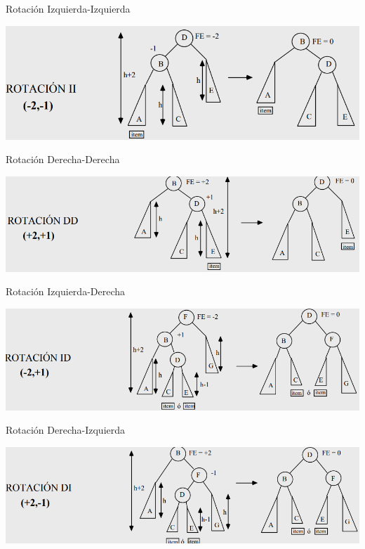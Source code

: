 \documentclass[handout]{beamer} %
\begin{document}
\begin{frame}{Rotación Izquierda-Izquierda}
    \begin{center}
        \includegraphics[width=\textwidth]{./image/cap3/II.PNG}
    \end{center}
\end{frame}
\begin{frame}{Rotación Derecha-Derecha}
    \begin{center}
        \includegraphics[width=\textwidth]{./image/cap3/DD.PNG}
    \end{center}
\end{frame}
\begin{frame}{Rotación Izquierda-Derecha}
    \begin{center}
        \includegraphics[width=\textwidth]{./image/cap3/ID.PNG}
    \end{center}
\end{frame}
\begin{frame}{Rotación Derecha-Izquierda}
    \begin{center}
        \includegraphics[width=\textwidth]{./image/cap3/DI.PNG}
    \end{center}
\end{frame}
\end{document}
